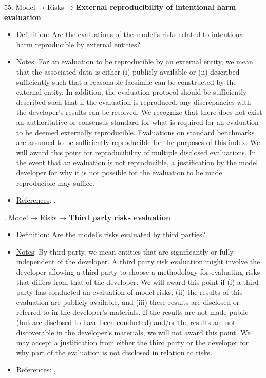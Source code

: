 55. Model → Risks → \textbf{External reproducibility of intentional harm evaluation}
\vspace{-\parskip}
\begin{itemize}
	\item
	\underline{Definition}: Are the evaluations of the model’s risks related to intentional harm reproducible by external entities?
	\item
	\underline{Notes}: For an evaluation to be reproducible by an external entity, we mean that the associated data is either (i) publicly available or (ii) described sufficiently such that a reasonable facsimile can be constructed by the external entity. In addition, the evaluation protocol should be sufficiently described such that if the evaluation is reproduced, any discrepancies with the developer's results can be resolved. We recognize that there does not exist an authoritative or consensus standard for what is required for an evaluation to be deemed externally reproducible. Evaluations on standard benchmarks are assumed to be sufficiently reproducible for the purposes of this index. We will award this point for reproducibility of multiple disclosed evaluations. In the event that an evaluation is not reproducible, a justification by the model developer for why it is not possible for the evaluation to be made reproducible may suffice.
	\item
	\underline{References}: \citet{kapoor2023leakage}, \citet{weidinger2021ethical}
\end{itemize} \vspace{\baselineskip}


. Model → Risks → \textbf{Third party risks evaluation}
\vspace{-\parskip}
\begin{itemize}
	\item
	\underline{Definition}: Are the model’s risks evaluated by third parties?
	\item
	\underline{Notes}: By third party, we mean entities that are significantly or fully independent of the developer. A third party risk evaluation might involve the developer allowing a third party to choose a methodology for evaluating risks that differs from that of the developer. We will award this point if (i) a third party has conducted an evaluation of model risks, (ii) the results of this evaluation are publicly available, and (iii) these results are disclosed or referred to in the developer’s materials. If the results are not made public (but are disclosed to have been conducted) and/or the results are not discoverable in the developer’s materials, we will not award this point. We may accept a justification from either the third party or the developer for why part of the evaluation is not disclosed in relation to risks.
	\item
	\underline{References}: \citet{raji2022audit}, \citet{weidinger2021ethical}
\end{itemize} \vspace{\baselineskip}



